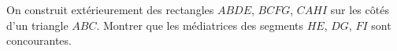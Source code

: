 On construit extérieurement des rectangles $ABDE$, $BCFG$, $CAHI$ sur les côtés d'un triangle $ABC$. Montrer que les médiatrices des segments $HE$, $DG$, $FI$ sont concourantes.
